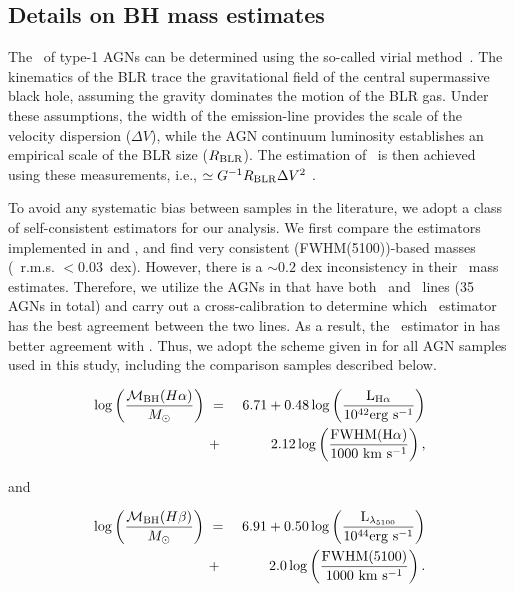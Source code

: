 \documentclass[apj]{emulateapj}
\begin{document}
\subsection{Details on BH mass estimates}
\label{mbh}

The \mbh\ of type-1 AGNs can be determined using the so-called virial method~\citep{Peterson2004, Shen2013}. The kinematics of the BLR trace the gravitational field of the central supermassive black hole, assuming the gravity dominates the motion of the BLR gas. Under these assumptions, the width of the emission-line provides the scale of the velocity dispersion ($\Delta V$), while the AGN continuum luminosity establishes an empirical scale of the BLR size ($R_{\rm BLR}$). The estimation of \mbh\ is then achieved using these measurements, i.e., \mbh$\simeq G^{-1} R_{\rm BLR} \Delta V^2$ \citep{McLure2004}.

To avoid any systematic bias between samples in the literature, we adopt a class of self-consistent estimators for our analysis. We first compare the estimators implemented in \citet{Schulze2018} and \citet{Ding2017b}, and find very consistent \hbeta(FWHM(5100))-based masses (\mbh\ r.m.s. $<0.03$~dex). However, there is a $\sim0.2$ dex inconsistency in their \halpha\ mass estimates. Therefore, we utilize the AGNs in \citet{Schulze2018} that have both \halpha\ and \hbeta\ lines (35 AGNs in total) and carry out a cross-calibration to determine which \halpha\ estimator has the best agreement between the two lines. As a  result, the \halpha\ estimator in \citet{Schulze2018} has better agreement with \hbeta. Thus, we adopt the scheme given in \citet{Schulze2018} for all AGN samples used in this study, including the comparison samples described below.

\begin{eqnarray}
\label{eq:Ha}
\log \left(\frac{\mathcal M_{\rm BH} (H\alpha)}{M_{\odot}}\right)&~=~& 6.71+0.48 \log \left(\frac{ \rm L _{H\alpha}}{10^{42}{\rm erg~s^{-1}}}\right) \nonumber\\
&~+~& 2.12 \log \left(\frac{\rm FWHM(H\alpha)}{1000 ~{\rm km~s^{-1}}}\right) ,
\end {eqnarray}

and

\begin{eqnarray}
\label{eq:Hb}
\log \left(\frac{\mathcal M_{\rm BH}(H\beta) }{M_{\odot}}\right)&~=~& 6.91+0.50\log \left(\frac{ \rm L _{\lambda_{5100}}}{10^{44}{\rm erg~s^{-1}}}\right) \nonumber\\
&~+~& 2.0 \log \left(\frac{\rm FWHM(5100)}{1000 ~{\rm km~s^{-1}}}\right) .
\end {eqnarray}
\end{document}
